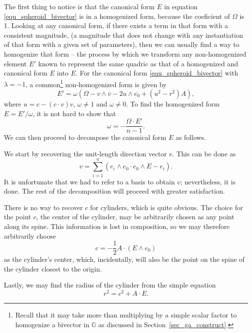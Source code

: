 \documentclass{birkjour}
\theoremstyle{definition}
\theoremstyle{remark}
\numberwithin{equation}{section}
\newcommand{\G}{\mathbb{G}}
\begin{document}
The first thing to notice is that the canonical form $E$ in equation \eqref{equ_spheroid_bivector}
is in a homogenized form, because the coeficient of $\Omega$ is 1.  Looking at any canonical form,
if there exists a term in that form with a consistent magnitude, (a magnitude that does not change
with any instantiation of that form with a given set of parameters), then we can usually find a way
to homogenize that form -- the process by which we transform any non-homogenized element $E'$
known to represent the same quadric as that of a homogenized and canonical form $E$ into $E$.
For the canonical form \eqref{equ_spheroid_bivector} with $\lambda=-1$, a common\footnote{Recall
that it may take more than multiplying by a simple scalar factor to homogenize a bivector in $\G$
as discussed in Section~\ref{sec_ga_construct}.}
non-homogenized form is given by
\begin{equation}
E' = \omega(\Omega - v\wedge\overline{v}-2u\wedge\overline{e_0}+(u^2-r^2)A),
\end{equation}
where $u=c-(c\cdot v)v$, $\omega\neq 1$ and $\omega\neq 0$.  To find the homogenized form $E=E'/\omega$,
it is not hard to show that
\begin{equation}
\omega = -\frac{\Omega\cdot E'}{n-1}.
\end{equation}
We can then proceed to decompose the canonical form $E$ as follows.

We start by recovering the unit-length direction vector $v$.  This can be
done as
\begin{equation}
v = \sum_{i=1}^n\left(\overline{e_i\wedge e_0\cdot e_0\wedge E}-e_i\right).
\end{equation}
It is unfortunate that we had to refer to a basis to obtain $v$; nevertheless,
it is done.  The rest of the decomposition will proceed with greater satisfaction.

There is no way to recover $c$ for cylinders, which is quite obvious.
The choice for the point $c$, the center of the cylinder, may be arbitrarily
chosen as any point along its spine.  This information is lost in composition,
so we may therefore arbitrarily choose
\begin{equation}
c=-\frac{1}{2}A\cdot(E\wedge e_0)
\end{equation}
as the cylinder's center, which, incidentally, will also be the point on the spine of
the cylinder closest to the origin.

Lastly, we may find the radius of the cylinder from the simple equation
\begin{equation}
r^2 = c^2 + A\cdot E.
\end{equation}
\end{document}
